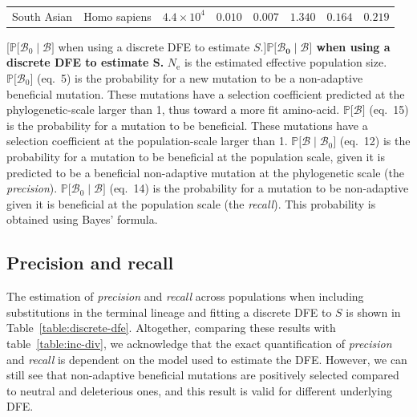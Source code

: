 \documentclass{article}
\newcommand{\Ne}{N_{\text{e}}}
\newcommand{\proba}{\mathbb{P}}
\newcommand{\SphyBen}{\mathcal{B}_0}
\newcommand{\given}{\mid}
\newcommand{\Spop}{S}
\newcommand{\SpopBen}{\mathcal{B}}
\begin{document}
\begin{center}
\begin{longtable*}{|l|l|r|r|r|r|r|r|}
            South Asian & Homo sapiens & $4.4\times 10^{4}$ & $ 0.010$ & $ 0.007$ & $ 1.340$ & $ 0.164$ & $ 0.219$ \\
        \end{longtable*}
        [$\proba{[}\SphyBen\given \SpopBen {]}$ when using a discrete DFE to estimate $\Spop$.]{\textbf{$\bm{\proba{[}\SphyBen\given \SpopBen {]}}$ when using a discrete DFE to estimate $\bm{\Spop}$.}
        $\Ne$ is the estimated effective population size.
        $\proba{[} \SphyBen {]}$ (eq.~5) is the probability for a new mutation to be a non-adaptive beneficial mutation.
        These mutations have a selection coefficient predicted at the phylogenetic-scale larger than 1, thus toward a more fit amino-acid.
        $\proba{[} \SpopBen {]}$ (eq.~15) is the probability for a mutation to be beneficial.
        These mutations have a selection coefficient at the population-scale larger than 1.
        $\proba{[} \SpopBen \given \SphyBen{]}$ (eq.~12) is the probability for a mutation to be beneficial at the population scale, given it is predicted to be a beneficial non-adaptive mutation at the phylogenetic scale (the \textit{precision}).
        $\proba{[} \SphyBen \given \SpopBen{]}$ (eq.~14) is the probability for a mutation to be non-adaptive given it is beneficial at the population scale (the \textit{recall}).
        This probability is obtained using Bayes' formula.\label{table:discrete-dfe-bayes}}
    \end{center}

    \newpage
    \subsection{Precision and recall}
    The estimation of \textit{precision} and \textit{recall} across populations when including substitutions in the terminal lineage and fitting a discrete DFE to $\Spop$ is shown in Table~\ref{table:discrete-dfe}.
    Altogether, comparing these results with table~\ref{table:inc-div}, we acknowledge that the exact quantification of \textit{precision} and \textit{recall} is dependent on the model used to estimate the DFE.
    However, we can still see that non-adaptive beneficial mutations are positively selected compared to neutral and deleterious ones, and this result is valid for different underlying DFE.
\end{document}
